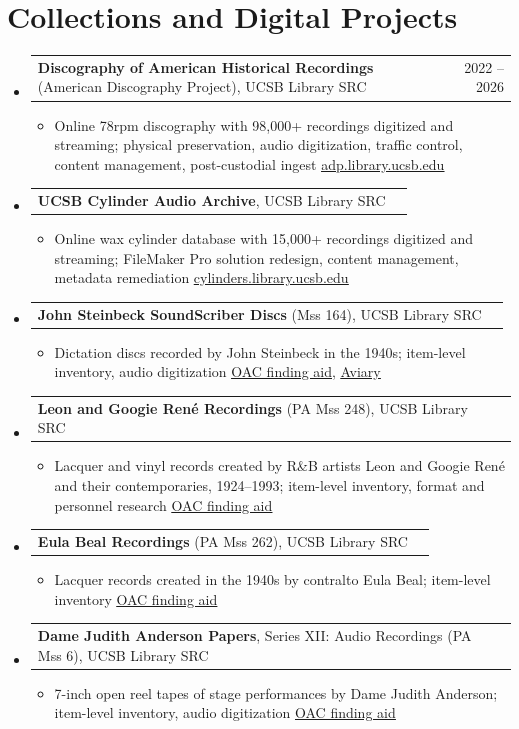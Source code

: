 \documentclass[letterpaper,10pt]{article}
\makeatletter
\newlength{\entrygap}   \setlength{\entrygap}{1pt}   %
\newlength{\listendgap} \setlength{\listendgap}{-4pt}  %
\newlength{\bulletgap}  \setlength{\bulletgap}{0pt}  %
\newlength{\groupindent}\setlength{\groupindent}{0.15in} %
\newcommand{\resumeItem}[1]{\item \small{#1}}
\newif\ifresumecont \resumecontfalse
\newcommand{\resumeProjectHeading}[2]{%
  \vspace{\entrygap}\item
    \begin{tabular*}{0.97\textwidth}[t]{l@{\extracolsep{\fill}}r}
      \small#1 & \small#2 \\
    \end{tabular*}%
}
\newcommand{\resumeSubHeadingListStart}{%
  \begin{itemize}[leftmargin=0.15in, label={},
                  itemsep=0pt, parsep=0pt, topsep=2pt, partopsep=0pt]}
\newcommand{\resumeSubHeadingListEnd}{\ifresumecont\vspace{\listendgap}\fi\end{itemize}}
\newcommand{\resumeItemListStart}{%
  \begin{itemize}[leftmargin=\groupindent, itemsep=\bulletgap,
                  parsep=0pt, topsep=1pt, partopsep=0pt]}
\newcommand{\resumeItemListEnd}{\resumecontfalse\end{itemize}}
\newcommand{\lnk}[2]{{\scriptsize\href{#1}{\underline{#2}}}}
\makeatother
\begin{document}
\section{Collections and Digital Projects}
  \resumeSubHeadingListStart
    \resumeProjectHeading
      {\textbf{Discography of American Historical Recordings} (American Discography Project), UCSB Library SRC}{2022 -- 2026}
      \resumeItemListStart
        \resumeItem{Online 78rpm discography with 98,000+ recordings digitized and streaming; physical preservation, audio digitization, traffic control, content management, post-custodial ingest \lnk{https://adp.library.ucsb.edu}{adp.library.ucsb.edu}}
      \resumeItemListEnd
    \resumeProjectHeading
      {\textbf{UCSB Cylinder Audio Archive}, UCSB Library SRC}{}
      \resumeItemListStart
        \resumeItem{Online wax cylinder database with 15,000+ recordings digitized and streaming; FileMaker Pro solution redesign, content management, metadata remediation \lnk{https://cylinders.library.ucsb.edu}{cylinders.library.ucsb.edu}}
      \resumeItemListEnd
    \resumeProjectHeading
      {\textbf{John Steinbeck SoundScriber Discs} (Mss 164), UCSB Library SRC}{}
      \resumeItemListStart
        \resumeItem{Dictation discs recorded by John Steinbeck in the 1940s; item-level inventory, audio digitization \lnk{https://oac.cdlib.org/findaid/ark:/13030/kt4489q2nz}{OAC finding aid}, \lnk{https://ucsblibrarysrc.aviaryplatform.com/collections/3890}{Aviary}}
      \resumeItemListEnd
    \resumeProjectHeading
      {\textbf{Leon and Googie Ren\'e Recordings} (PA Mss 248), UCSB Library SRC}{}
      \resumeItemListStart
        \resumeItem{Lacquer and vinyl records created by R\&B artists Leon and Googie Ren\'e and their contemporaries, 1924--1993; item-level inventory, format and personnel research \lnk{https://oac.cdlib.org/findaid/ark:/13030/c8qj7rnt}{OAC finding aid}}
      \resumeItemListEnd
    \resumeProjectHeading
      {\textbf{Eula Beal Recordings} (PA Mss 262), UCSB Library SRC}{}
      \resumeItemListStart
        \resumeItem{Lacquer records created in the 1940s by contralto Eula Beal; item-level inventory \lnk{https://oac.cdlib.org/findaid/ark:/13030/c8bz6f4q}{OAC finding aid}}
      \resumeItemListEnd
    \resumeProjectHeading
      {\textbf{Dame Judith Anderson Papers}, Series XII: Audio Recordings (PA Mss 6), UCSB Library SRC}{}
      \resumeItemListStart
        \resumeItem{7-inch open reel tapes of stage performances by Dame Judith Anderson; item-level inventory, audio digitization \lnk{https://oac.cdlib.org/findaid/ark:/13030/tf8x0nb6v0}{OAC finding aid}}
      \resumeItemListEnd
  \resumeSubHeadingListEnd
\end{document}
